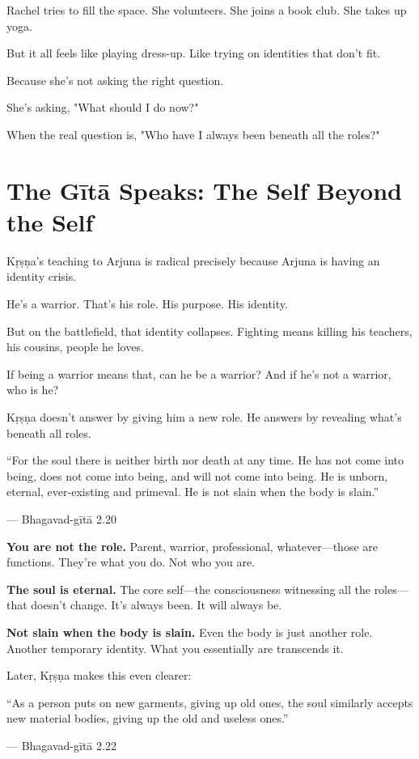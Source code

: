 \documentclass[11pt,twoside]{book}
\begin{document}
Rachel tries to fill the space. She volunteers. She joins a book club. She takes up yoga.

But it all feels like playing dress-up. Like trying on identities that don't fit.

Because she's not asking the right question.

She's asking, "What should I do now?"

When the real question is, "Who have I always been beneath all the roles?"

\section*{The Gītā Speaks: The Self Beyond the Self}

Kṛṣṇa's teaching to Arjuna is radical precisely because Arjuna is having an identity crisis.

He's a warrior. That's his role. His purpose. His identity.

But on the battlefield, that identity collapses. Fighting means killing his teachers, his cousins, people he loves.

If being a warrior means that, can he be a warrior? And if he's not a warrior, who is he?

Kṛṣṇa doesn't answer by giving him a new role. He answers by revealing what's beneath all roles.

\begin{pullquote}
``For the soul there is neither birth nor death at any time. He has not come into being, does not come into being, and will not come into being. He is unborn, eternal, ever-existing and primeval. He is not slain when the body is slain.''

--- Bhagavad-gītā 2.20
\end{pullquote}

\textbf{\textbf{You are not the role.}} Parent, warrior, professional, whatever—those are functions. They're what you do. Not who you are.

\textbf{\textbf{The soul is eternal.}} The core self—the consciousness witnessing all the roles—that doesn't change. It's always been. It will always be.

\textbf{\textbf{Not slain when the body is slain.}} Even the body is just another role. Another temporary identity. What you essentially are transcends it.

Later, Kṛṣṇa makes this even clearer:

\begin{pullquote}
``As a person puts on new garments, giving up old ones, the soul similarly accepts new material bodies, giving up the old and useless ones.''

--- Bhagavad-gītā 2.22
\end{pullquote}
\end{document}
